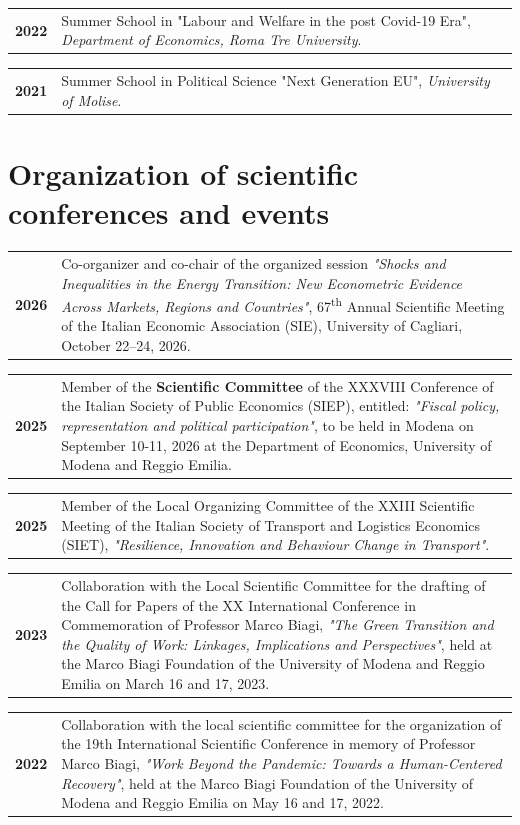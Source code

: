 \documentclass[11pt,a4paper,sans]{moderncv} %
\newcommand{\cvitemcols}[3]{%
  \begin{tabular}{p{#1}p{\dimexpr\linewidth-#1\relax}}
    \textbf{#2} & #3
  \end{tabular}\par\vspace{6pt}
}
\begin{document}
\cvitemcols{2cm}{2022}{Summer School in "Labour and Welfare in the post Covid-19 Era", \textit{Department of Economics, Roma Tre University}.}

\cvitemcols{2.3cm}{2021}{Summer School in Political Science "Next Generation EU", \textit{University of Molise}.}















\section{\textbf{Organization of scientific conferences and events}}

\cvitemcols{2cm}{2026}{Co-organizer and co-chair of the organized session \textit{"Shocks and Inequalities in the Energy Transition: New Econometric Evidence Across Markets, Regions and Countries"}, 67\textsuperscript{th} Annual Scientific Meeting of the Italian Economic Association (SIE), University of Cagliari, October 22--24, 2026.}


\cvitemcols{2cm}{2025}{Member of the \textbf{Scientific Committee} of the XXXVIII Conference of the Italian Society of Public Economics (SIEP), entitled: \textit{"Fiscal policy, representation and political participation"}, to be held in Modena on September 10-11, 2026 at the Department of Economics, University of Modena and Reggio Emilia.}


\cvitemcols{2cm}{2025}{Member of the Local Organizing Committee of the XXIII Scientific Meeting of the Italian Society of Transport and Logistics Economics (SIET), \textit{"Resilience, Innovation and Behaviour Change in Transport"}.}

\cvitemcols{2cm}{2023}{Collaboration with the Local Scientific Committee for the drafting of the Call for Papers of the XX International Conference in Commemoration of Professor Marco Biagi, \textit{"The Green Transition and the Quality of Work: Linkages, Implications and Perspectives"}, held at the Marco Biagi Foundation of the University of Modena and Reggio Emilia on March 16 and 17, 2023.}

\cvitemcols{2cm}{2022}{Collaboration with the local scientific committee for the organization of the 19th International Scientific Conference in memory of Professor Marco Biagi, \textit{"Work Beyond the Pandemic: Towards a Human-Centered Recovery"}, held at the Marco Biagi Foundation of the University of Modena and Reggio Emilia on May 16 and 17, 2022.}
\end{document}

